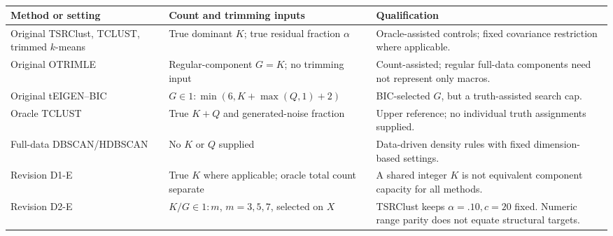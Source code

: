 \begin{table}[!htbp]
\caption{}
\label{tab:c4-information}
\centering\footnotesize\setlength{\tabcolsep}{3pt}
\begin{tabularx}{\linewidth}{p{.25\linewidth}p{.31\linewidth}X}
\toprule
\rowcolor{RevisionBackground} Method or setting & Count and trimming inputs & Qualification \\
\midrule
\rowcolor{RevisionBackground} Original TSRClust, TCLUST, trimmed $k$-means & True dominant $K$; true residual fraction $\alpha$ & Oracle-assisted controls; fixed covariance restriction where applicable. \\
\rowcolor{RevisionBackground} Original OTRIMLE & Regular-component $G=K$; no trimming input & Count-assisted; regular full-data components need not represent only macros. \\
\rowcolor{RevisionBackground} Original tEIGEN--BIC & $G\in1{:}\min(6,K+\max(Q,1)+2)$ & BIC-selected $G$, but a truth-assisted search cap. \\
\rowcolor{RevisionBackground} Oracle TCLUST & True $K+Q$ and generated-noise fraction & Upper reference; no individual truth assignments supplied. \\
\rowcolor{RevisionBackground} Full-data DBSCAN/HDBSCAN & No $K$ or $Q$ supplied & Data-driven density rules with fixed dimension-based settings. \\
\rowcolor{RevisionBackground} Revision D1-E & True $K$ where applicable; oracle total count separate & A shared integer $K$ is not equivalent component capacity for all methods. \\
\rowcolor{RevisionBackground} Revision D2-E & $K/G\in1{:}m$, $m=3,5,7$, selected on $X$ & TSRClust keeps $\alpha=.10,c=20$ fixed. Numeric range parity does not equate structural targets. \\
\bottomrule
\end{tabularx}
\end{table}
